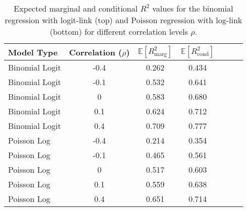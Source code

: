 \begin{table}[H]
    \centering
    \begin{tabular}{lcccccc}
    \toprule
    \textbf{Model Type} & \textbf{Correlation (\(\rho\))} & $\mathbb{E}[R^2_{\text{marg}}]$ &  $\mathbb{E}[R^2_{\text{cond}}]$ \\
    \midrule
    Binomial Logit & -0.4 & 0.262 & 0.434 \\
    Binomial Logit & -0.1 & 0.532 & 0.641 \\
    Binomial Logit & 0    & 0.583 & 0.680 \\
    Binomial Logit & 0.1  & 0.624 & 0.712 \\
    Binomial Logit & 0.4  & 0.709 & 0.777 \\
    \midrule
    Poisson Log  & -0.4 & 0.214 & 0.354 \\
    Poisson Log  & -0.1 & 0.465 & 0.561 \\
    Poisson Log  & 0    & 0.517 & 0.603 \\
    Poisson Log  & 0.1  & 0.559 & 0.638 \\
    Poisson Log  & 0.4  & 0.651 & 0.714 \\
    \bottomrule
    \end{tabular}
    \caption[Expected $R^2$ for non-Gaussian GLMMs]{Expected marginal and conditional $R^2$ values for the binomial regression with logit-link (top) and Poisson regression with log-link (bottom) for different correlation levels $\rho$.}
    \label{table:r2values}
\end{table}

